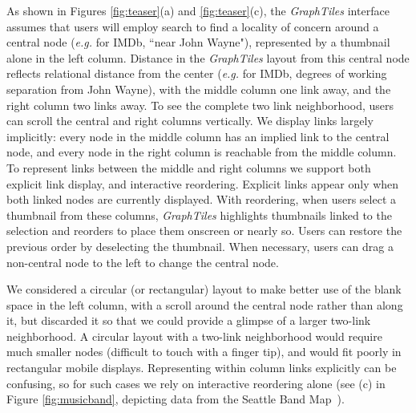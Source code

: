 As shown in Figures \ref{fig:teaser}(a) and \ref{fig:teaser}(c), the \textit{GraphTiles} interface assumes that users will employ search to find a locality of concern around a central node (\textit{e.g.} for IMDb, ``near John Wayne"), represented by a thumbnail alone in the left column. Distance in the \textit{GraphTiles} layout from this central node reflects relational distance from the center (\textit{e.g.} for IMDb, degrees of working separation from John Wayne), with the middle column one link away, and the right column two links away. To see the complete two link neighborhood, users can scroll the central and right columns vertically. We display links largely implicitly: every node in the middle column has an implied link to the central node, and every node in the right column is reachable from the middle column. To represent links between the middle and right columns we support both explicit link display, and interactive reordering. Explicit links appear only when both linked nodes are currently displayed. With reordering, when users select a thumbnail from these columns, \textit{GraphTiles} highlights thumbnails linked to the selection and reorders to place them onscreen or nearly so. Users can restore the previous order by deselecting the thumbnail. When necessary, users can drag a non-central node to the left to change the central node.

We considered a circular (or rectangular) layout to make better use of the blank space in the left column, with a scroll around the central node rather than along it, but discarded it so that we could provide a glimpse of a larger two-link neighborhood. A circular layout with a two-link neighborhood would require much smaller nodes (difficult to touch with a finger tip), and would fit poorly in rectangular mobile displays. Representing within column links explicitly can be confusing, so for such cases we rely on interactive reordering alone (see (c) in Figure \ref{fig:musicband}, depicting data from the Seattle Band Map~\cite{seattleband}).
